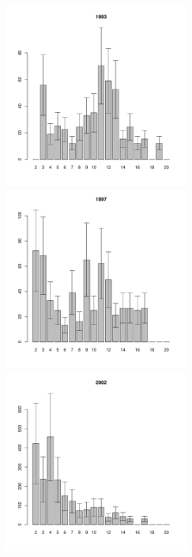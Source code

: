\begin{figure}[hp]
\begin{minipage}[b]{.3\linewidth}
\begin{center}
	\end{center}
	\end{minipage}
	\begin{minipage}[b]{.3\linewidth}
	\begin{center}
	\includegraphics[width=60mm]{../White_Sea/Luvenga_II_razrez/zostera_zone2_1993_.pdf}
	\end{center}
	\end{minipage}
	\hfil %
	\begin{minipage}[b]{.3\linewidth}
	\begin{center}
	\includegraphics[width=60mm]{../White_Sea/Luvenga_II_razrez/zostera_zone2_1997_.pdf}
	\end{center}
	\end{minipage}
	\hfil %
	\begin{minipage}[b]{.3\linewidth}
	\begin{center}
	\includegraphics[width=60mm]{../White_Sea/Luvenga_II_razrez/zostera_zone2_2002_.pdf}
	\end{center}
	\end{minipage}



\end{figure}
